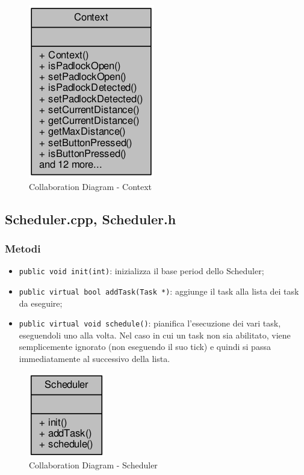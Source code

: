 \begin{figure}[!ht]
	\centering
	\includegraphics[scale=.5]{img/UML/CollaborationDiagram/Context.png}
	\caption{Collaboration Diagram - Context}
\end{figure}

\newpage
\subsection{Scheduler.cpp, Scheduler.h}
\subsubsection{Metodi}
\begin{itemize}
	\item \texttt{public void init(int)}: inizializza il base period dello Scheduler;
	\item \texttt{public virtual bool addTask(Task *)}: aggiunge il task alla lista dei task da eseguire;
	\item \texttt{public virtual void schedule()}: pianifica l'esecuzione dei vari task, eseguendoli uno alla volta. Nel caso in cui un task non sia abilitato, viene semplicemente ignorato (non eseguendo il suo tick) e quindi si passa immediatamente al successivo della lista.
\end{itemize}
\begin{figure}[!ht]
	\centering
	\includegraphics[scale=.5]{img/UML/CollaborationDiagram/Scheduler.png}
	\caption{Collaboration Diagram - Scheduler}
\end{figure}

